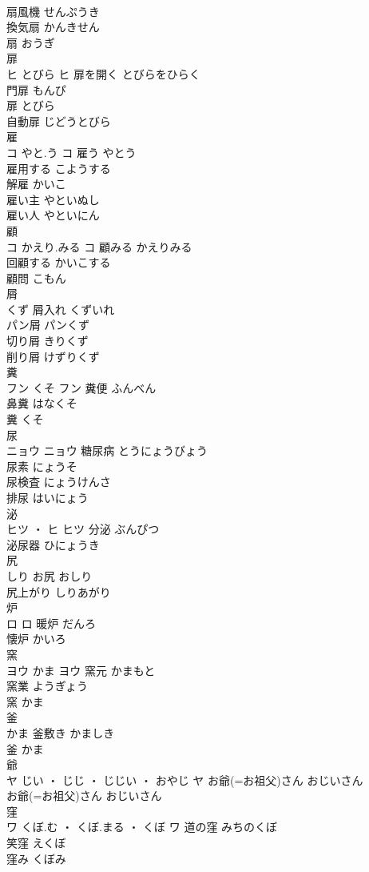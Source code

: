 \documentclass[8pt]{extreport}
\begin{document}
\begin{CJK}{UTF8}{min}
\\	扇風機	せんぷうき	
\\	換気扇	かんきせん	
\\	扇	おうぎ	
\\	扉	
\\	ヒ	とびら	ヒ	扉を開く	とびらをひらく	
\\	門扉	もんぴ	
\\	扉	とびら	
\\	自動扉	じどうとびら	
\\	雇	
\\	コ	やと.う	コ	雇う	やとう	
\\	雇用する	こようする	
\\	解雇	かいこ	
\\	雇い主	やといぬし	
\\	雇い人	やといにん	
\\	顧	
\\	コ	かえり.みる	コ	顧みる	かえりみる	
\\	回顧する	かいこする	
\\	顧問	こもん	
\\	屑	
\\	くず		屑入れ	くずいれ	
\\	パン屑	パンくず	
\\	切り屑	きりくず	
\\	削り屑	けずりくず	
\\	糞	
\\	フン	くそ	フン	糞便	ふんべん	
\\	鼻糞	はなくそ	
\\	糞	くそ	
\\	尿	
\\	ニョウ		ニョウ	糖尿病	とうにょうびょう	
\\	尿素	にょうそ	
\\	尿検査	にょうけんさ	
\\	排尿	はいにょう	
\\	泌	
\\	ヒツ ・ ヒ		ヒツ	分泌	ぶんぴつ	
\\	泌尿器	ひにょうき	
\\	尻	
\\	しり		お尻	おしり	
\\	尻上がり	しりあがり	
\\	炉	
\\	ロ		ロ	暖炉	だんろ	
\\	懐炉	かいろ	
\\	窯	
\\	ヨウ	かま	ヨウ	窯元	かまもと	
\\	窯業	ようぎょう	
\\	窯	かま	
\\	釜	
\\	かま		釜敷き	かましき	
\\	釜	かま	
\\	爺	
\\	ヤ	じい ・ じじ ・ じじい ・ おやじ	ヤ	お爺(=お祖父)さん	おじいさん	
\\	お爺(=お祖父)さん	おじいさん	
\\	窪	
\\	ワ	くぼ.む ・ くぼ.まる ・ くぼ	ワ	道の窪	みちのくぼ	
\\	笑窪	えくぼ	
\\	窪み	くぼみ	
\end{CJK}
\end{document}
